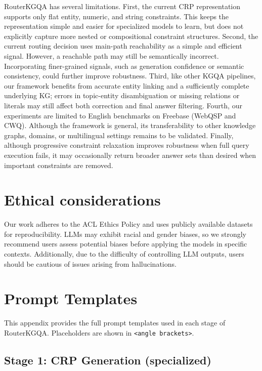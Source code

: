 \documentclass[11pt]{article}
\begin{document}
RouterKGQA has several limitations.
First, the current CRP representation supports only flat entity, numeric,
and string constraints. This keeps the representation simple and easier
for specialized models to learn, but does not explicitly capture more
nested or compositional constraint structures.
Second, the current routing decision uses main-path reachability as a
simple and efficient signal. However, a reachable path may still be
semantically incorrect. Incorporating finer-grained signals, such as
generation confidence or semantic consistency, could further improve
robustness.
Third, like other KGQA pipelines, our framework benefits from accurate
entity linking and a sufficiently complete underlying KG; errors in
topic-entity disambiguation or missing relations or literals may still
affect both correction and final answer filtering.
Fourth, our experiments are limited to English benchmarks on Freebase
(WebQSP and CWQ). Although the framework is general, its transferability
to other knowledge graphs, domains, or multilingual settings remains to
be validated.
Finally, although progressive constraint relaxation improves robustness
when full query execution fails, it may occasionally return broader
answer sets than desired when important constraints are removed.

\section*{Ethical considerations}
Our work adheres to the ACL Ethics Policy and uses publicly available datasets for reproducibility. LLMs may exhibit racial and gender biases, so we strongly recommend users assess potential biases before applying the models in specific contexts. Additionally, due to the difficulty of controlling LLM outputs, users should be cautious of issues arising from hallucinations.




\appendix

\section{Prompt Templates}
\label{app:prompts}

This appendix provides the full prompt templates used in each stage of RouterKGQA. Placeholders are shown in \texttt{<angle brackets>}.

\subsection{Stage 1: CRP Generation (specialized)}
\label{app:prompt_mrp}
\end{document}
